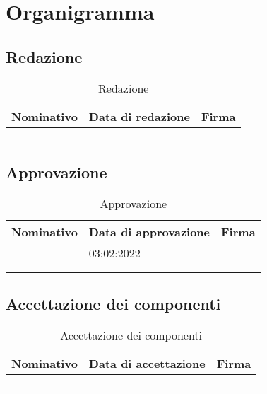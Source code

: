 \section{Organigramma}

\subsection{Redazione}
\renewcommand{\arraystretch}{2}
\begin{table}[H]
	\begin{tabular}{|p{4cm}|p{2cm}|p{4cm}|}
		\hline
		\textbf{Nominativo}& \textbf{Data di redazione}  & \textbf{Firma}  \\ \hline
		&  &   \\ \hline
		&  &   \\ \hline
		&  &   \\ \hline
	\end{tabular}
	\caption{Redazione}
\end{table}

\subsection{Approvazione}
\begin{table}[H]
	\begin{tabular}{|p{4cm}|p{2cm}|p{4cm}|}
		\hline
		\textbf{Nominativo}& \textbf{Data di approvazione}  & \textbf{Firma}  \\ \hline
		&03:02:2022  &   \\ \hline
		&  &   \\ \hline
		&  &   \\ \hline
	\end{tabular}
	\caption{Approvazione}
\end{table}

\subsection{Accettazione dei componenti}
\begin{table}[H]
	\begin{tabular}{|p{4cm}|p{2cm}|p{4cm}|}
		\hline
		\textbf{Nominativo}& \textbf{Data di accettazione}  & \textbf{Firma}  \\ \hline
		&  &   \\ \hline
		&  &   \\ \hline
		&  &   \\ \hline
	\end{tabular}
	\caption{Accettazione dei componenti}
\end{table}

